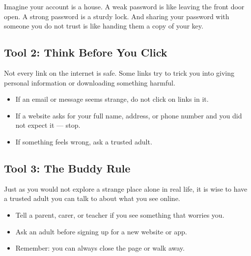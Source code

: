 \begin{picturethis}
  Imagine your account is a house.
  A weak password is like leaving the front door open.
  A strong password is a sturdy lock.
  And sharing your password with someone you do not trust is
  like handing them a copy of your key.
\end{picturethis}

\vspace{6pt}

\subsection*{Tool 2: Think Before You Click}

Not every link on the internet is safe.
Some links try to trick you into giving personal information
or downloading something harmful.

\begin{itemize}
  \item If an email or message seems strange, do not click on links in it.
  \item If a website asks for your full name, address, or phone number and you did not expect it — stop.
  \item If something feels wrong, ask a trusted adult.
\end{itemize}


\vspace{6pt}

\subsection*{Tool 3: The Buddy Rule}

Just as you would not explore a strange place alone in real life,
it is wise to have a trusted adult you can talk to about what you see online.

\begin{itemize}
  \item Tell a parent, carer, or teacher if you see something that worries you.
  \item Ask an adult before signing up for a new website or app.
  \item Remember: you can always close the page or walk away.
\end{itemize}

